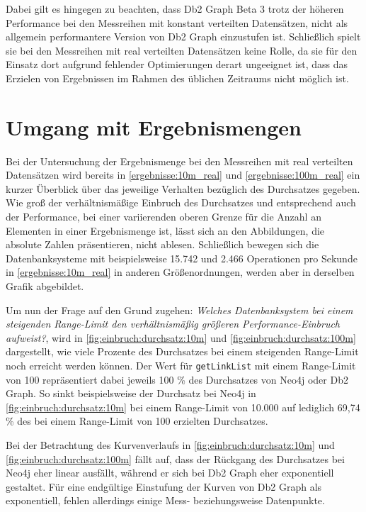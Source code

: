Dabei gilt es hingegen zu beachten, dass Db2 Graph Beta 3 trotz der höheren Performance bei den Messreihen mit konstant verteilten Datensätzen, nicht als allgemein performantere Version von Db2 Graph einzustufen ist. Schließlich spielt sie bei den Messreihen mit real verteilten Datensätzen keine Rolle, da sie für den Einsatz dort aufgrund fehlender Optimierungen derart ungeeignet ist, dass das Erzielen von Ergebnissen im Rahmen des üblichen Zeitraums nicht möglich ist.

\section{Umgang mit Ergebnismengen}
\label{auswertung:ergebnismenge}
Bei der Untersuchung der Ergebnismenge bei den Messreihen mit real verteilten Datensätzen wird bereits in \autoref{ergebnisse:10m_real} und \autoref{ergebnisse:100m_real} ein kurzer Überblick über das jeweilige Verhalten bezüglich des Durchsatzes gegeben. Wie groß der verhältnismäßige Einbruch des Durchsatzes und entsprechend auch der Performance, bei einer variierenden oberen Grenze für die Anzahl an Elementen in einer Ergebnismenge ist, lässt sich an den Abbildungen, die absolute Zahlen präsentieren, nicht ablesen. Schließlich bewegen sich die Datenbanksysteme mit beispielsweise 15.742 und 2.466 Operationen pro Sekunde in \autoref{ergebnisse:10m_real} in anderen Größenordnungen, werden aber in derselben Grafik abgebildet. 

Um nun der Frage auf den Grund zugehen: \textit{Welches Datenbanksystem bei einem steigenden Range-Limit den verhältnismäßig größeren Performance-Einbruch aufweist?}, wird in \autoref{fig:einbruch:durchsatz:10m} und \autoref{fig:einbruch:durchsatz:100m} dargestellt, wie viele Prozente des Durchsatzes bei einem steigenden Range-Limit noch erreicht werden können. Der Wert für \texttt{getLinkList} mit einem Range-Limit von 100 repräsentiert dabei jeweils 100 \% des Durchsatzes von Neo4j oder Db2 Graph. So sinkt beispielsweise der Durchsatz bei Neo4j in \autoref{fig:einbruch:durchsatz:10m} bei einem Range-Limit von 10.000 auf lediglich 69,74 \% des bei einem Range-Limit von 100 erzielten Durchsatzes. 

Bei der Betrachtung des Kurvenverlaufs in \autoref{fig:einbruch:durchsatz:10m} und \autoref{fig:einbruch:durchsatz:100m} fällt auf, dass der Rückgang des Durchsatzes bei Neo4j eher linear ausfällt, während er sich bei Db2 Graph eher exponentiell gestaltet. Für eine endgültige Einstufung der Kurven von Db2 Graph als exponentiell, fehlen allerdings einige Mess- beziehungsweise Datenpunkte.

